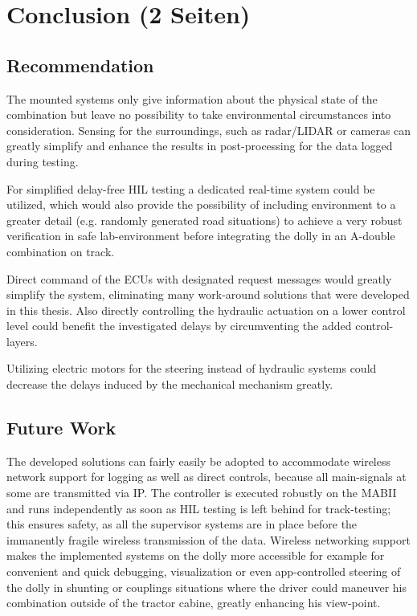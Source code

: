 \documentclass[ExampleMasters.tex]{subfiles}
\begin{document}
\clearpage
{\pagestyle{empty}\cleardoublepage}%
\chapter{Conclusion (2 Seiten)}
\label{chap:conclusion}

\section{Recommendation}
\label{sec:recommendation}

The mounted systems only give information about the physical state of the combination but leave no possibility to take environmental circumstances into consideration. Sensing for the surroundings, such as radar/LIDAR or cameras can greatly simplify and enhance the results in post-processing for the data logged during testing. 

For simplified delay-free \gls{HIL} testing a dedicated real-time system could be utilized, which would also provide the possibility of including environment to a greater detail (e.g. randomly generated road situations) to achieve a very robust verification in safe lab-environment before integrating the dolly in an A-double combination on track.

Direct command of the \gls{ECU}s with designated request messages would greatly simplify the system, eliminating many work-around solutions that were developed in this thesis. Also directly controlling the hydraulic actuation on a lower control level could benefit the investigated delays by circumventing the added control-layers.

Utilizing electric motors for the steering instead of hydraulic systems could decrease the delays induced by the mechanical mechanism greatly. 



\section{Future Work}
\label{sec:future_work}

The developed solutions can fairly easily be adopted to accommodate wireless network support for logging as well as direct controls, because all main-signals at some are transmitted via \gls{IP}. The controller is executed robustly on the \gls{MABII} and runs independently as soon as \gls{HIL} testing is left behind for track-testing; this ensures safety, as all the supervisor systems are in place before the immanently fragile wireless transmission of the data. Wireless networking support makes the implemented systems on the dolly more accessible for example for convenient and quick debugging, visualization or even app-controlled steering of the dolly in shunting or couplings situations where the driver could maneuver his combination outside of the tractor cabine, greatly enhancing his view-point.
\end{document}
